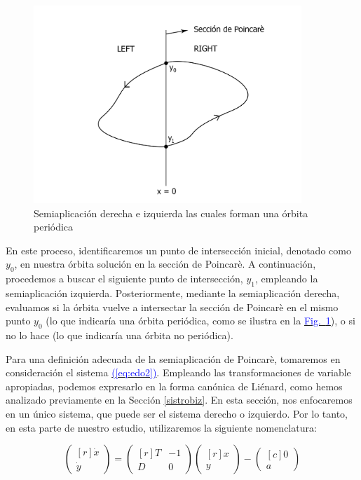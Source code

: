 \documentclass[12pt,a4paper]{report} %
\newcommand{\fref}[1]{\hyperref[#1]{\textcolor{blue}{Fig.~\ref*{#1}}}}
\newcommand{\eref}[1]{\hyperref[#1]{\textcolor{blue}{(\ref*{#1})}}}
\newcommand{\fref}[1]{\hyperref[#1]{\textcolor{blue}{\textit{Fig.~\ref*{#1}}}}}
\newcommand{\eref}[1]{\hyperref[#1]{\textcolor{blue}{\textit{(\ref*{#1})}}}}
\begin{document}
	\begin{figure}[h]
		\centering
		\includegraphics[width=0.9\textwidth]{poincaLR.jpg}
		\caption{Semiaplicación derecha e izquierda las cuales forman una órbita periódica}
		\label{fig:poincaLR}
	\end{figure}\smallskip
	
	En este proceso, identificaremos un punto de intersección inicial, denotado como $y_0$, en nuestra órbita solución en la sección de Poincarè. A continuación, procedemos a buscar el siguiente punto de intersección, $y_1$, empleando la semiaplicación izquierda. Posteriormente, mediante la semiaplicación derecha, evaluamos si la órbita vuelve a intersectar la sección de Poincarè en el mismo punto $y_0$ (lo que indicaría una órbita periódica, como se ilustra en la \fref{fig:poincaLR}), o si no lo hace (lo que indicaría una órbita no periódica).
	
	\vspace{0.5cm}Para una definición adecuada de la semiaplicación de Poincarè, tomaremos en consideración el sistema \eref{eq:edo2}. Empleando las transformaciones de variable apropiadas, podemos expresarlo en la forma canónica de Liénard, como hemos analizado previamente en la Sección \ref{sistrobiz}. En esta sección, nos enfocaremos en un único sistema, que puede ser el sistema derecho o izquierdo. Por lo tanto, en esta parte de nuestro estudio, utilizaremos la siguiente nomenclatura:
	
		\begin{equation}
		\label{eq:lienardsolo}
		\begin{pmatrix*}[r]
			\dot{x}\\ \dot{y}
		\end{pmatrix*}= \begin{pmatrix*}[r]
			T & -1 \\ D & 0
		\end{pmatrix*} \begin{pmatrix*}[r]
			x \\ y
		\end{pmatrix*}-\begin{pmatrix*}[c]
			0 \\ a
		\end{pmatrix*}
	\end{equation}\smallskip
	\newpage
	
\end{document}
